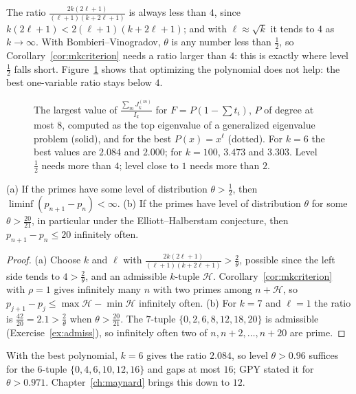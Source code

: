 The ratio $\frac{2k(2\ell+1)}{(\ell+1)(k+2\ell+1)}$ is always less than $4$, since $k(2\ell+1)<2(\ell+1)(k+2\ell+1)$; and with $\ell\approx\sqrt k$ it tends to $4$ as $k\to\infty$. With Bombieri--Vinogradov, $\theta$ is any number less than $\frac12$, so Corollary~\ref{cor:mkcriterion} needs a ratio larger than $4$: this is exactly where level $\frac12$ falls short. Figure~\ref{fig:gpyratio} shows that optimizing the polynomial does not help: the best one-variable ratio stays below $4$.

\begin{figure}[ht]
\centering
{}
\caption{The largest value of $\frac{\sum_mJ^{(m)}_k}{I_k}$ for $F=P(1-\sum t_i)$, $P$ of degree at most $8$, computed as the top eigenvalue of a generalized eigenvalue problem (solid), and for the best $P(x)=x^\ell$ (dotted). For $k=6$ the best values are $2.084$ and $2.000$; for $k=100$, $3.473$ and $3.303$. Level $\frac12$ needs more than $4$; level close to $1$ needs more than $2$.}
\label{fig:gpyratio}
\end{figure}

\begin{theorem}\label{thm:gpy}
(a) If the primes have some level of distribution $\theta>\frac12$, then $\liminf(p_{n+1}-p_n)<\infty$.
(b) If the primes have level of distribution $\theta$ for some $\theta>\frac{20}{21}$, in particular under the Elliott--Halberstam conjecture, then $p_{n+1}-p_n\le20$ infinitely often.
\end{theorem}
\begin{proof}
(a) Choose $k$ and $\ell$ with $\frac{2k(2\ell+1)}{(\ell+1)(k+2\ell+1)}>\frac2\theta$, possible since the left side tends to $4>\frac2\theta$, and an admissible $k$-tuple $\mathcal H$. Corollary~\ref{cor:mkcriterion} with $\rho=1$ gives infinitely many $n$ with two primes among $n+\mathcal H$, so $p_{j+1}-p_j\le\max\mathcal H-\min\mathcal H$ infinitely often.
(b) For $k=7$ and $\ell=1$ the ratio is $\frac{42}{20}=2.1>\frac2\theta$ when $\theta>\frac{20}{21}$. The $7$-tuple $\{0,2,6,8,12,18,20\}$ is admissible (Exercise~\ref{ex:admiss}), so infinitely often two of $n,n+2,\dots,n+20$ are prime.
\end{proof}

With the best polynomial, $k=6$ gives the ratio $2.084$, so level $\theta>0.96$ suffices for the $6$-tuple $\{0,4,6,10,12,16\}$ and gaps at most $16$; GPY stated it for $\theta>0.971$. Chapter~\ref{ch:maynard} brings this down to $12$.

